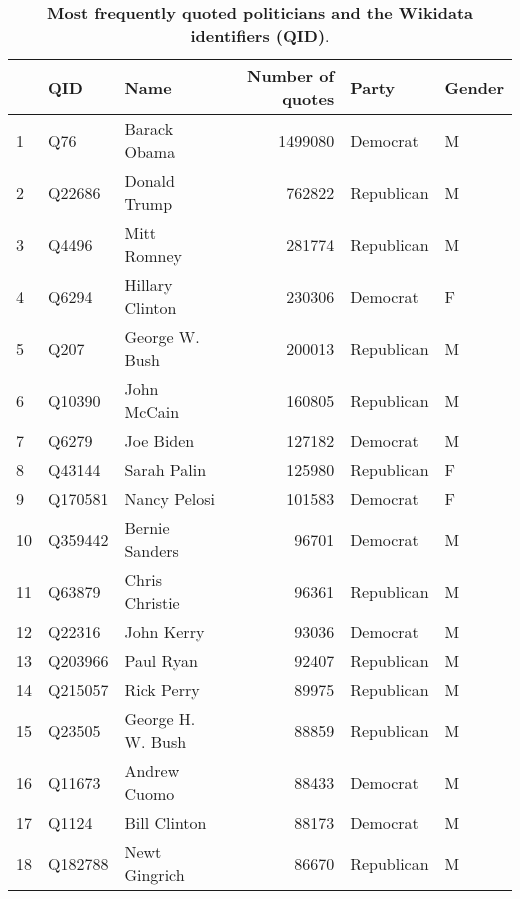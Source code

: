 \begin{table}[h]\centering
\caption{\textbf{Most frequently quoted politicians and the Wikidata identifiers (QID)}. }
	\label{fig: Top30}
\begin{adjustbox}{width=\linewidth, center}
	\begin{tabular}{lllrll}
	\toprule
	{} &       QID &               Name &  Number of quotes &       Party & Gender \\
	\midrule
	1  &       Q76 &       Barack Obama &           1499080 &    Democrat &      M \\
	2  &    Q22686 &       Donald Trump &            762822 &  Republican &      M \\
	3  &     Q4496 &        Mitt Romney &            281774 &  Republican &      M \\
	4  &     Q6294 &    Hillary Clinton &            230306 &    Democrat &      F \\
	5  &      Q207 &     George W. Bush &            200013 &  Republican &      M \\
	6  &    Q10390 &        John McCain &            160805 &  Republican &      M \\
	7  &     Q6279 &          Joe Biden &            127182 &    Democrat &      M \\
	8  &    Q43144 &        Sarah Palin &            125980 &  Republican &      F \\
	9  &   Q170581 &       Nancy Pelosi &            101583 &    Democrat &      F \\
	10 &   Q359442 &     Bernie Sanders &             96701 &    Democrat &      M \\
	11 &    Q63879 &     Chris Christie &             96361 &  Republican &      M \\
	12 &    Q22316 &         John Kerry &             93036 &    Democrat &      M \\
	13 &   Q203966 &          Paul Ryan &             92407 &  Republican &      M \\
	14 &   Q215057 &         Rick Perry &             89975 &  Republican &      M \\
	15 &    Q23505 &  George H. W. Bush &             88859 &  Republican &      M \\
	16 &    Q11673 &       Andrew Cuomo &             88433 &    Democrat &      M \\
	17 &     Q1124 &       Bill Clinton &             88173 &    Democrat &      M \\
	18 &   Q182788 &      Newt Gingrich &             86670 &  Republican &      M \\

\end{tabular}
\end{adjustbox}
\end{table}
